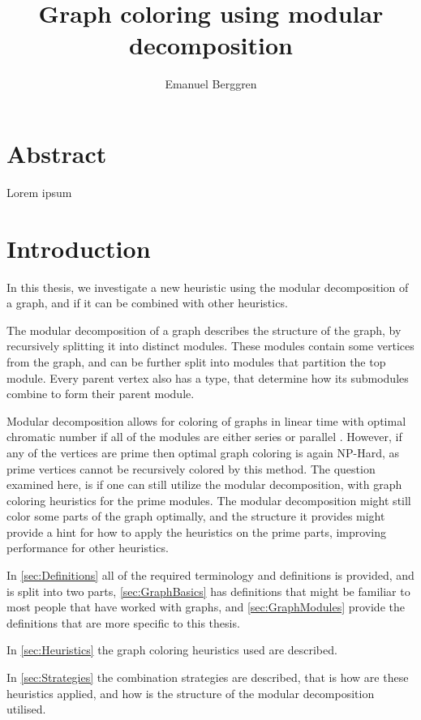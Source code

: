 \documentclass{amsart}
\author{Emanuel Berggren}
\title{Graph coloring using modular decomposition}
\begin{document}
\maketitle

\section{Abstract}

Lorem ipsum

\section{Introduction}

In this thesis, we investigate a new heuristic using the modular decomposition of
a graph, and if it can be combined with other heuristics. 

The modular decomposition of a graph describes the structure of the graph, by
recursively splitting it into distinct modules. These modules contain some
vertices from the graph, and can be further split into modules that partition
the top module. Every parent vertex also has a type, that determine how its submodules
combine to form their parent module.

Modular decomposition allows for coloring of graphs in linear time with optimal
chromatic number if all of the modules are either  series or
parallel \cite{HCL}. However, if any of the vertices are prime then optimal graph coloring 
is again NP-Hard, as prime vertices cannot be recursively colored by this
method. The question examined here, is if one can still utilize the
modular decomposition, with graph coloring heuristics for the prime modules.
The modular decomposition might still color some parts of the graph optimally,
and the structure it provides might provide a hint for how to apply the
heuristics on the prime parts, improving performance for other heuristics.

In \autoref{sec:Definitions} all of the required terminology and definitions is
provided, and is split into two parts, \autoref{sec:GraphBasics} has definitions that might be
familiar to most people that have worked with graphs, and
\autoref{sec:GraphModules} provide the definitions that are more specific to
this thesis.

In \autoref{sec:Heuristics} the graph coloring heuristics used are described.

In \autoref{sec:Strategies} the combination strategies are described, that is how are
these heuristics applied, and how is the structure of the modular decomposition
utilised.
\end{document}
